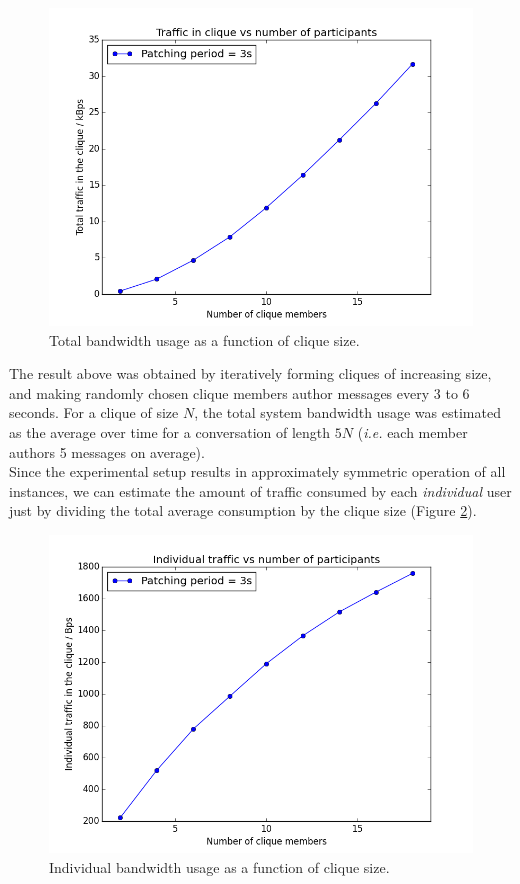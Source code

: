 \documentclass[a4paper, twoside, 12pt]{report}
\begin{document}
\begin{figure}[H]
    \captionsetup{width=0.9\textwidth}
    \centering
    \includegraphics[width=0.65\linewidth]{pics/eval/alltraf_vs_N.png}
    \caption{\label{fig:alltraf} Total bandwidth usage as a function of clique size.}
\end{figure}
The result above was obtained by iteratively forming cliques of increasing size, and making randomly chosen clique members author messages every 3 to 6 seconds. For a clique of size $N$, the total system bandwidth usage was estimated as the average over time for a conversation of length $5N$ (\textit{i.e.} each member authors 5 messages on average). \\

Since the experimental setup results in approximately symmetric operation of all instances, we can estimate the amount of traffic consumed by each \emph{individual} user just by dividing the total average consumption by the clique size (Figure \ref{fig:traf_vs_N}).

\begin{figure}[H]
    \captionsetup{width=0.9\textwidth}
    \centering
    \includegraphics[width=0.65\linewidth]{pics/eval/traf_vs_N.png}
    \caption{\label{fig:traf_vs_N} Individual bandwidth usage as a function of clique size.}
\end{figure}
\end{document}

